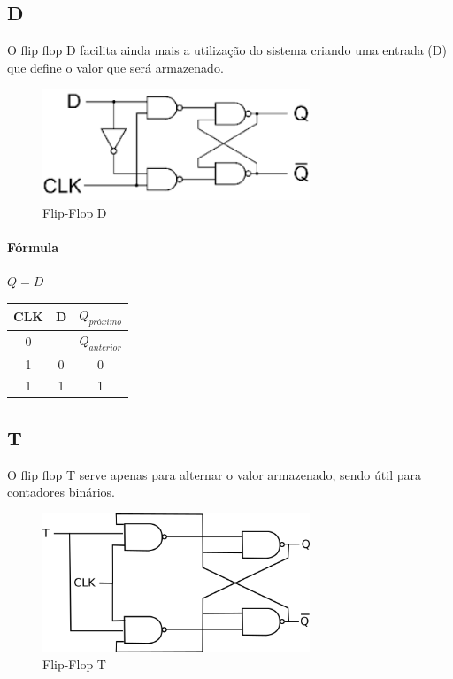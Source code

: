 \documentclass{article}
\begin{document}
        \subsection{D}

            O flip flop D facilita ainda mais a utilização do sistema criando uma entrada (D) que define o valor que será armazenado.

            \begin{figure} [H] 
                \includegraphics[width=8cm]{flipflop-d.png}
                \caption{Flip-Flop D}
                \label{fig:flipflop-d}
            \end{figure}

            \paragraph{Fórmula}
            $Q = D$
            \newline
            \newline
            \begin{tabular}{||c c c||}
                \hline
                CLK &   D   &   $Q_{próximo}$       \\
                \hline\hline
                0   &   -   &   $Q_{anterior}$      \\
                1   &   0   &   0                   \\
                1   &   1   &   1                   \\
                \hline
            \end{tabular}

        \subsection{T}

            O flip flop T serve apenas para alternar o valor armazenado, sendo útil para contadores binários.

            \begin{figure} [H] 
                \includegraphics[width=8cm]{flipflop-t.png}
                \caption{Flip-Flop T}
                \label{fig:flipflop-t}
            \end{figure}
\end{document}
